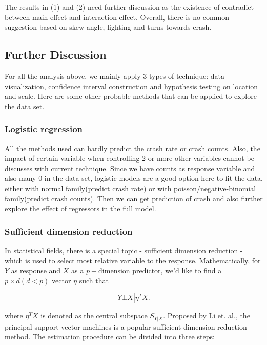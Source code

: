 \documentclass[11pt]{scrartcl} %
\begin{document}
The results in (1) and (2) need further discussion as the existence of contradict between main effect and interaction effect. Overall, there is no common suggestion based on skew angle, lighting and turns towards crash.


\subsection{Further Discussion}

For all the analysis above, we mainly apply 3 types of technique: data visualization, confidence interval construction and hypothesis testing on location and scale. Here are some other probable methods that can be applied to explore the data set.

\subsubsection{Logistic regression}

All the methods used can hardly predict the crash rate or crash counts. Also, the impact of certain variable when controlling 2 or more other variables cannot be discusses with current technique. Since we have counts as response variable and also many 0 in the data set, logistic models are a good option here to fit the data, either with normal family(predict crash rate) or with poisson/negative-binomial family(predict crash counts). Then we can get prediction of crash and also further explore the effect of regressors in the full model.

\subsubsection{Sufficient dimension reduction}

In statistical fields, there is a special topic - sufficient dimension reduction - which is used to select most relative variable to the response. Mathematically, for $Y$ as response and $X$ as a $p-$dimension predictor, we'd like to find a $p \times d\left( {d < p} \right)$ vector $\eta $ such that

\begin{equation*}
Y \bot X\left| {{\eta ^T}X}. \right.
\end{equation*}

where ${\eta ^T}X$ is denoted as the central subspace ${S_{Y\left| X \right.}}$. Proposed by Li et. al.\cite{li2011principal}, the principal support vector machines is a popular sufficient dimension reduction method. The estimation procedure can be divided into three steps:
\end{document}

